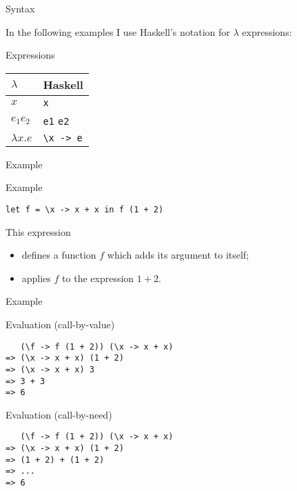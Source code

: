 %
\begin{frame}[fragile]{Syntax}

In the following examples I use Haskell's notation for $\lambda$ expressions:

\begin{block}{Expressions}
\begin{tabular}{ll}
$\lambda$       & Haskell \\
\hline
$x$             & \texttt{x} \\
$e_1 e_2$       & \texttt{e1} \texttt{e2} \\
$\lambda x . e$ & \verb!\x -> e! \\
\end{tabular}
\end{block}

\end{frame}

%
\begin{frame}[fragile]{Example}

\begin{block}{Example}
\begin{verbatim}
let f = \x -> x + x in f (1 + 2)
\end{verbatim}
\end{block}

This expression 

\begin{itemize}
  \item defines a function $f$ which adds its argument to itself;
  \item applies $f$ to the expression $1+2$.
\end{itemize}

\end{frame}

%
\begin{frame}[fragile]{Example}

\begin{block}{Evaluation (call-by-value)}
\begin{verbatim}
   (\f -> f (1 + 2)) (\x -> x + x)
=> (\x -> x + x) (1 + 2)
=> (\x -> x + x) 3
=> 3 + 3
=> 6
\end{verbatim}
\end{block}

\begin{block}{Evaluation (call-by-need)}
\begin{verbatim}
   (\f -> f (1 + 2)) (\x -> x + x)
=> (\x -> x + x) (1 + 2)
=> (1 + 2) + (1 + 2)
=> ...
=> 6
\end{verbatim}
\end{block}

\end{frame}

